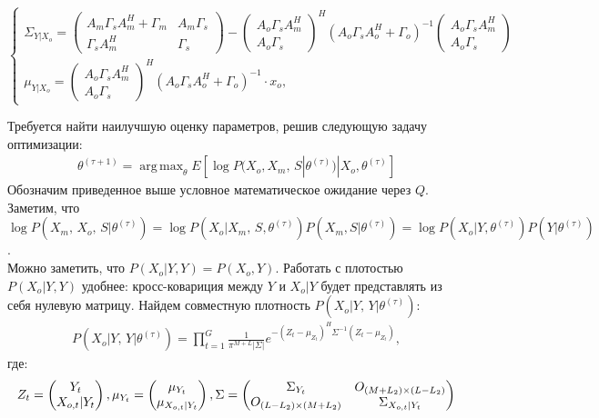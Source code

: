 \documentclass[11pt]{article}
\DeclareMathOperator*{\argmax}{arg\,max}
\begin{document}
\begin{equation}
\left\{ \begin{gathered} 
\Sigma_{Y|X_o} = \begin{pmatrix}
A_m \Gamma_s A_m^H + \Gamma_m&A_m \Gamma_s\\
\Gamma_s A_m^H&\Gamma_s
\end{pmatrix}- \begin{pmatrix}
A_o\Gamma_s A_m^H\\
A_o\Gamma_s
\end{pmatrix}^H(A_o\Gamma_sA_o^H+\Gamma_o)^{-1} \begin{pmatrix}
A_o\Gamma_s A_m^H\\
A_o\Gamma_s
\end{pmatrix} \\
\mu_{Y|X_o} =   \begin{pmatrix}
A_o\Gamma_s A_m^H\\
A_o\Gamma_s
\end{pmatrix}^H(A_o\Gamma_sA_o^H+\Gamma_o)^{-1}\cdot x_o,
\end{gathered} \right.
\end{equation}
\begin{center}
\fontsize{16}{20}\selectfont {}
\end{center}
Требуется найти наилучшую оценку параметров, решив следующую задачу оптимизации:
\begin{gather}
\theta^{(\tau+1)}=\argmax_{\theta} E[\log P(X_o, X_m, \, S|\theta^{(\tau)})|X_o, \theta^{(\tau)}]
\end{gather}
Обозначим приведенное выше условное математическое ожидание через $Q$. 
Заметим, что \\ $\log P(X_m, \, X_o, \, S|\theta^{(\tau)}) = \log P(X_o|X_m, \, S,\theta^{(\tau)})P(X_m, S|\theta^{(\tau)}) = \log P(X_o|Y,\theta^{(\tau)})P(Y|\theta^{(\tau)})$.\\
Можно заметить, что $P(X_o|Y, Y) = P(X_o, Y)$. Работать с плотостью $P(X_o|Y, Y)$ удобнее: кросс-ковариция между $Y$ и $X_o|Y$ будет представлять из себя нулевую матрицу.
Найдем совместную плотность $P(X_o|Y, \, Y|\theta^{(\tau)})$:
\begin{gather}
P(X_o|Y, \, Y|\theta^{(\tau)}) = \prod_{t=1}^G \frac{1}{\pi^{M+L}|\Sigma|}e^{-(Z_t-\mu_{Z_t})^H\Sigma^{-1}(Z_t-\mu_{Z_t})},
\end{gather}
где:
\begin{equation*}
Z_t = \begin{pmatrix}
Y_t\\
X_{o,t}|Y_t
\end{pmatrix},
\mu_{Y_t} = \begin{pmatrix}
\mu_{Y_t}\\
\mu_{X_{o,t}|Y_t}
\end{pmatrix}\\,
\Sigma = 
\begin{pmatrix}
\Sigma_{Y_t}&O_{(M+L_2)\times (L-L_2)}\\
O_{(L-L_2)\times (M+L_2)}&\Sigma_{X_{o,t}|Y_t}
\end{pmatrix}
\end{equation*}
\end{document}

